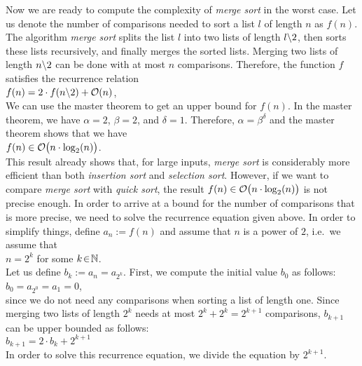 \noindent
Now we are ready to compute the complexity of \emph{merge sort} in the worst case.  Let us denote
the number of comparisons needed to sort a list $l$ of length $n$ as $f(n)$.  The algorithm \emph{merge sort} 
splits the list $l$ into two lists of length $l\symbol{92}2$, then sorts these lists recursively,
and finally merges the sorted lists.  Merging two lists of length $n \symbol{92}2$ can be done with
at most $n$ comparisons.  Therefore, the function $f$ satisfies the recurrence relation
\\[0.2cm]
\hspace*{1.3cm}
$f(n) = 2 \cdot f(n \symbol{92} 2) + \Oh(n)$,
\\[0.2cm]
We can use the master theorem to get an upper bound for $f(n)$.  In the master theorem, we have
$\alpha = 2$, $\beta = 2$, and $\delta = 1$. Therefore, $\alpha = \beta^\delta$ and the master
theorem shows that we have
\\[0.2cm]
\hspace*{1.3cm}
$f(n) \in \mathcal{O}\bigl(n \cdot \log_2(n) \bigr)$.
\\[0.2cm]
This result already shows that, for large inputs, \emph{merge sort} is considerably more efficient
than both \emph{insertion sort} and \emph{selection sort}.  However, if we want to compare
\emph{merge sort} with \emph{quick sort}, the result $f(n) \in \mathcal{O}\bigl(n \cdot \log_2(n) \bigr)$ is
not precise enough.  In order to arrive at a bound for the number of comparisons that is more precise,
we need to solve the recurrence equation given above.  In order to simplify things,  define $a_n := f(n)$ 
and assume that $n$ is a power of $2$, i.e.~we assume that
\\[0.2cm]
\hspace*{1.3cm}
$\displaystyle n = 2^k$ \qquad for some $k \!\in\! \mathbb{N}$.
\\[0.2cm]
Let us define $b_k := a_n = a_{2^k}$.  First, we compute the initial value $b_0$ as follows:
\\[0.2cm]
\hspace*{1.3cm}
$\displaystyle b_0 = a_{2^0} = a_1 = 0$,
\\[0.2cm]
since we do not need any comparisons when sorting a list of length one.  Since merging two lists of
length $2^k$ needs at most  $2^k + 2^k = 2^{k+1}$ comparisons, $b_{k+1}$ can be upper bounded as follows:
\\[0.2cm]
\hspace*{1.3cm}
$b_{k+1} = 2 \cdot b_k + 2^{k+1}$ 
\\[0.2cm]
In order to solve this recurrence equation, we divide the equation by $2^{k+1}$.
